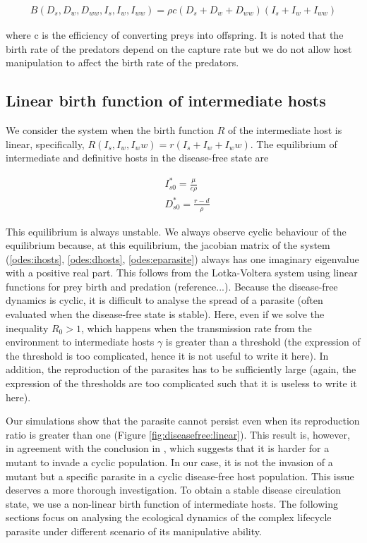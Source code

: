 \documentclass[11pt]{article}
\begin{document}
\begin{align*}
B(D_s, D_w, D_{ww}, I_s, I_w, I_{ww}) = \rho c (D_s + D_w + D_{ww}) (I_s + I_w + I_{ww})
\end{align*}

where c is the efficiency of converting preys into offspring. It is noted that the birth rate of the predators depend on the capture rate but we do not allow host manipulation to affect the birth rate of the predators.

\subsection*{Linear birth function of intermediate hosts}
We consider the system when the birth function $R$ of the intermediate host is linear, specifically, $R(I_s, I_w, I_ww) = r(I_s + I_w + I_ww)$. The equilibrium of intermediate and definitive hosts in the disease-free state are

\begin{align*}
& I_{s0}^* = \frac{\mu}{c \rho} \\
& D_{s0}^* = \frac{r - d}{\rho}
\end{align*}

This equilibrium is always unstable. 
We always observe cyclic behaviour of the equilibrium because, at this equilibrium, the jacobian matrix of the system (\ref{odes:ihosts}, \ref{odes:dhosts}, \ref{odes:eparasite}) always has one imaginary eigenvalue with a positive real part. 
This follows from the Lotka-Voltera system using linear functions for prey birth and predation (reference...). 
Because the disease-free dynamics is cyclic, it is difficult to analyse the spread of a parasite (often evaluated when the disease-free state is stable). 
Here, even if we solve the inequality $R_0 > 1$, which happens when the transmission rate from the environment to intermediate hosts $\gamma$ is greater than a threshold (the expression of the threshold is too complicated, hence it is not useful to write it here). 
In addition, the reproduction of the parasites has to be sufficiently large (again, the expression of the thresholds are too complicated such that it is useless to write it here).

Our simulations show that the parasite cannot persist even when its reproduction ratio is greater than one (Figure \ref{fig:diseasefree:linear}). This result is, however, in agreement with the conclusion in \citet{Ripa:Evol:2013}, which suggests that it is harder for a mutant to invade a cyclic population. 
In our case, it is not the invasion of a mutant but a specific parasite in a cyclic disease-free host population. 
This issue deserves a more thorough investigation. 
To obtain a stable disease circulation state, we use a non-linear birth function of intermediate hosts. The following sections focus on analysing the ecological dynamics of the complex lifecycle parasite under different scenario of its manipulative ability.
\end{document}
